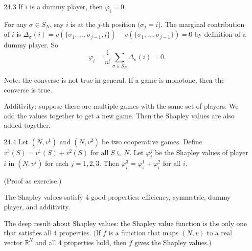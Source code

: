 \documentclass[12pt,letterpaper]{report}
\begin{document}
\begin{prop}{}{24.3}
  If $i$ is a dummy player, then $\varphi_i = 0$.
\end{prop}

\begin{thmproof}
  For any $\sigma \in S_N$, say $i$ is at the $j$-th position $(\sigma_j = i$).
  The marginal contribution of $i$ is $\Delta_\sigma(i) =
    v(\{\sigma_1, \ldots, \sigma_{j - 1}, i\}) - v(\{\sigma_1, \ldots, \sigma_{j - 1}\}) = 0$ by
  definition of a dummy player.
  So
  \[
    \varphi_i = \frac{1}{n!} \sum_{\sigma \in S_N} \Delta_\sigma(i) = 0.
  \]
\end{thmproof}

Note: the converse is not true in general.
If a game is monotone, then the converse is true.

\begin{enumcase}[start=4]
  \item
  Additivity: suppose there are multiple games with the same set of players.
  We add the values together to get a new game.
  Then the Shapley values are also added together.
\end{enumcase}

\begin{prop}{}{24.4}
  Let $(N, v^1)$ and $(N, v^2)$ be two cooperative games.
  Define $v^3(S) = v^1(S) + v^2(S)$ for all $S \subseteq N$.
  Let $\varphi_i^j$ be the Shapley values of player $i$ in $(N, v^j)$ for each $j = 1, 2, 3$.
  Then $\varphi_i^3 = \varphi_i^1 + \varphi_i^2$ for all $i$.
\end{prop}

(Proof as exercise.)

The Shapley values satisfy 4 good properties: efficiency, symmetric, dummy player, and additivity.

The deep result about Shapley values: the Shapley value function is the only one that satisfies all
4 properties.
(If $f$ is a function that maps $(N, v)$ to a real vector $\mathbb{R}^N$ and all 4 properties hold,
then $f$ gives the Shapley values.)

\end{document}
